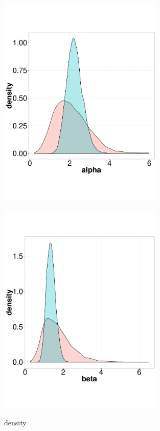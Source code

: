   \begin{figure}%
  \begin{minipage}[!hp]{0.45\linewidth}
  \centering
    \includegraphics [width=0.70\textwidth, angle=0]{figs/dist_alpha.pdf}
    \vspace{-0 in}
     \label{fig:dist_alpha}
  \end{minipage}
  \begin{minipage}[!hp]{0.45\linewidth}
  \centering
    \includegraphics [width=0.70\textwidth, angle=0]{figs/dist_beta.pdf}
    \vspace{-0 in}
     \label{fig:dist_beta}
  \end{minipage}
    \caption{density}
  \end{figure}

